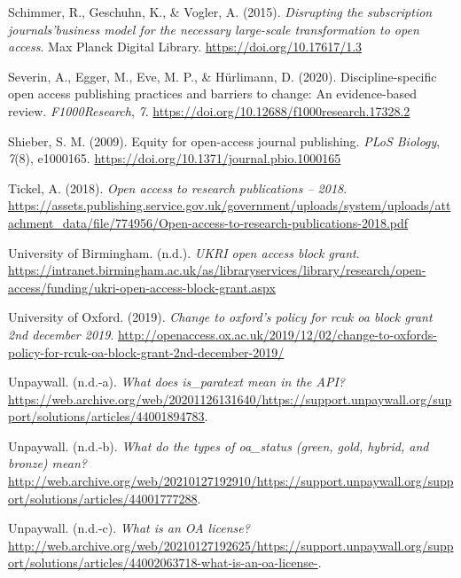 \documentclass[a4paper,man,floatsintext,longtable,noextraspace,12pt]{apa6}
\newlength{\cslhangindent}
\newenvironment{cslreferences}%
  {\setlength{\parindent}{0pt}%
  \everypar{\setlength{\hangindent}{\cslhangindent}}\ignorespaces}%
  {\par}
\begin{document}
\begin{cslreferences}
\leavevmode\hypertarget{ref-Schimmer_2015}{}%
Schimmer, R., Geschuhn, K., \& Vogler, A. (2015). \emph{Disrupting the
subscription journals'business model for the necessary large-scale
transformation to open access}. Max Planck Digital Library.
\url{https://doi.org/10.17617/1.3}

\leavevmode\hypertarget{ref-Severin_2020}{}%
Severin, A., Egger, M., Eve, M. P., \& Hürlimann, D. (2020).
Discipline-specific open access publishing practices and barriers to
change: An evidence-based review. \emph{F1000Research}, \emph{7}.
\url{https://doi.org/10.12688/f1000research.17328.2}

\leavevmode\hypertarget{ref-Shieber_2009}{}%
Shieber, S. M. (2009). Equity for open-access journal publishing.
\emph{PLoS Biology}, \emph{7}(8), e1000165.
\url{https://doi.org/10.1371/journal.pbio.1000165}

\leavevmode\hypertarget{ref-Tickel_2018}{}%
Tickel, A. (2018). \emph{Open access to research publications -- 2018}.
\url{https://assets.publishing.service.gov.uk/government/uploads/system/uploads/attachment_data/file/774956/Open-access-to-research-publications-2018.pdf}

\leavevmode\hypertarget{ref-birmingham}{}%
University of Birmingham. (n.d.). \emph{UKRI open access block grant}.
\url{https://intranet.birmingham.ac.uk/as/libraryservices/library/research/open-access/funding/ukri-open-access-block-grant.aspx}

\leavevmode\hypertarget{ref-oxford_2019}{}%
University of Oxford. (2019). \emph{Change to oxford's policy for rcuk
oa block grant 2nd december 2019}.
\url{http://openaccess.ox.ac.uk/2019/12/02/change-to-oxfords-policy-for-rcuk-oa-block-grant-2nd-december-2019/}

\leavevmode\hypertarget{ref-Unpaywall_para}{}%
Unpaywall. (n.d.-a). \emph{What does is\_paratext mean in the API?}
\url{https://web.archive.org/web/20201126131640/https://support.unpaywall.org/support/solutions/articles/44001894783}.

\leavevmode\hypertarget{ref-Unpaywall_types}{}%
Unpaywall. (n.d.-b). \emph{What do the types of oa\_status (green, gold,
hybrid, and bronze) mean?}
\url{http://web.archive.org/web/20210127192910/https://support.unpaywall.org/support/solutions/articles/44001777288}.

\leavevmode\hypertarget{ref-Unpaywall_oa_license}{}%
Unpaywall. (n.d.-c). \emph{What is an OA license?}
\url{http://web.archive.org/web/20210127192625/https://support.unpaywall.org/support/solutions/articles/44002063718-what-is-an-oa-license-}.


\end{cslreferences}
\end{document}
